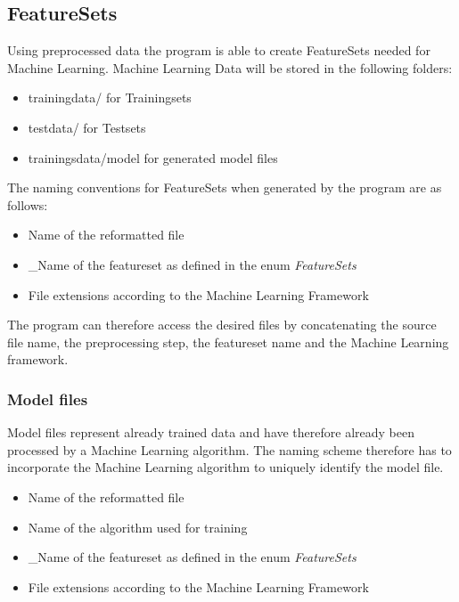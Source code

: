 \documentclass[10pt,a4paper,titlepage]{report}
\begin{document}
	\subsection{FeatureSets}
	Using preprocessed data the program is able to create FeatureSets needed for Machine Learning. Machine Learning Data will be stored in the following folders: 
	\begin{itemize}
		\item trainingdata/ for Trainingsets
		\item testdata/ for Testsets
		\item trainingsdata/model for generated model files
	\end{itemize}
	The naming conventions for FeatureSets when generated by the program are as follows:
	\begin{itemize}
		\item Name of the reformatted file
		\item \_Name of the featureset as defined in the enum \textit{FeatureSets}
		\item File extensions according to the Machine Learning Framework
	\end{itemize}
	The program can therefore access the desired files by concatenating the source file name, the preprocessing step, the featureset name and the Machine Learning framework.
	\subsubsection{Model files}
	Model files represent already trained data and have therefore already been processed by a Machine Learning algorithm. The naming scheme therefore has to incorporate the Machine Learning algorithm to uniquely identify the model file.
	\begin{itemize}
		\item Name of the reformatted file
		\item Name of the algorithm used for training
		\item \_Name of the featureset as defined in the enum \textit{FeatureSets}
		\item File extensions according to the Machine Learning Framework
	\end{itemize}
\end{document}
